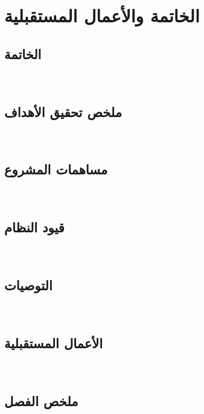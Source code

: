\chapter{الخاتمة والأعمال المستقبلية}
\label{ch:conclusion}

\section{الخاتمة}
\label{sec:conclusion}
~

\section{ملخص تحقيق الأهداف}
\label{sec:goals-achievement}
~

\section{مساهمات المشروع}
\label{sec:contributions}
~

\section{قيود النظام}
\label{sec:limitations}
~

\section{التوصيات}
\label{sec:recommendations}
~

\section{الأعمال المستقبلية}
\label{sec:future-work}
~

\section{ملخص الفصل}
\label{sec:conclusion-summary}
~
